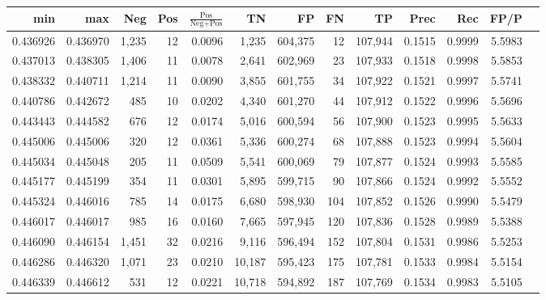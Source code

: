 \begin{tabular}{rrrrrrrrrrrrr}
\toprule
     min &      max &   Neg &   Pos & $\frac{\text{Pos}}{\text{Neg}+\text{Pos}}$ &      TN &      FP &      FN &      TP &   Prec &    Rec &   FP/P \\
\midrule
0.436926 & 0.436970 & 1,235 &    12 &                                     0.0096 &   1,235 & 604,375 &      12 & 107,944 & 0.1515 & 0.9999 & 5.5983 \\
0.437013 & 0.438305 & 1,406 &    11 &                                     0.0078 &   2,641 & 602,969 &      23 & 107,933 & 0.1518 & 0.9998 & 5.5853 \\
0.438332 & 0.440711 & 1,214 &    11 &                                     0.0090 &   3,855 & 601,755 &      34 & 107,922 & 0.1521 & 0.9997 & 5.5741 \\
0.440786 & 0.442672 &   485 &    10 &                                     0.0202 &   4,340 & 601,270 &      44 & 107,912 & 0.1522 & 0.9996 & 5.5696 \\
0.443443 & 0.444582 &   676 &    12 &                                     0.0174 &   5,016 & 600,594 &      56 & 107,900 & 0.1523 & 0.9995 & 5.5633 \\
0.445006 & 0.445006 &   320 &    12 &                                     0.0361 &   5,336 & 600,274 &      68 & 107,888 & 0.1523 & 0.9994 & 5.5604 \\
0.445034 & 0.445048 &   205 &    11 &                                     0.0509 &   5,541 & 600,069 &      79 & 107,877 & 0.1524 & 0.9993 & 5.5585 \\
0.445177 & 0.445199 &   354 &    11 &                                     0.0301 &   5,895 & 599,715 &      90 & 107,866 & 0.1524 & 0.9992 & 5.5552 \\
0.445324 & 0.446016 &   785 &    14 &                                     0.0175 &   6,680 & 598,930 &     104 & 107,852 & 0.1526 & 0.9990 & 5.5479 \\
0.446017 & 0.446017 &   985 &    16 &                                     0.0160 &   7,665 & 597,945 &     120 & 107,836 & 0.1528 & 0.9989 & 5.5388 \\
0.446090 & 0.446154 & 1,451 &    32 &                                     0.0216 &   9,116 & 596,494 &     152 & 107,804 & 0.1531 & 0.9986 & 5.5253 \\
0.446286 & 0.446320 & 1,071 &    23 &                                     0.0210 &  10,187 & 595,423 &     175 & 107,781 & 0.1533 & 0.9984 & 5.5154 \\
0.446339 & 0.446612 &   531 &    12 &                                     0.0221 &  10,718 & 594,892 &     187 & 107,769 & 0.1534 & 0.9983 & 5.5105 \\

\end{tabular}
